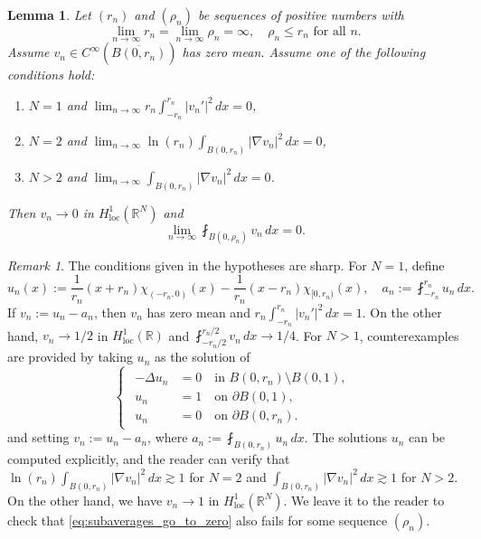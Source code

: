 \documentclass{article}
\numberwithin{equation}{section}
\newtheorem{lemma}[theorem]{Lemma}
\theoremstyle{definition}
\theoremstyle{remark}
\newtheorem{remark}{Remark}[theorem]
\begin{document}
\begin{lemma} \label{lm:vanishing_averages}
    Let $(r_n)$ and $(\rho_n)$ be sequences of positive numbers with
    \[
    \lim_{n \to \infty} r_n = \lim_{n \to \infty} \rho_n = \infty, \quad \rho_n \le r_n \text{ for all } n.
    \]
    Assume $v_n \in C^\infty(\overline{B(0, r_n)})$ has zero mean. Assume one of the following conditions hold:
    \begin{enumerate}
        \item[(1)] $N = 1$ and $\lim_{n \to \infty} r_n \int_{-r_n}^{r_n} |v_n'|^2 \, dx = 0$,
        \item[(2)] $N = 2$ and $\lim_{n \to \infty} \ln(r_n) \int_{B(0, r_n)} |\nabla v_n|^2 \, dx = 0$,
        \item[(3)] $N > 2$ and $\lim_{n \to \infty} \int_{B(0, r_n)} |\nabla v_n|^2 \, dx = 0$.
    \end{enumerate}
    Then $v_n \to 0$ in $H_\mathrm{loc}^1(\mathbb{R}^N)$ and
    \begin{equation} \label{eq:subaverages_go_to_zero}
        \lim_{n \to \infty} \fint_{B(0, \rho_n)} v_n \, dx = 0.
    \end{equation}
\end{lemma}

\begin{remark} \label{rmk:explanation_of_the_factors}
    The conditions given in the hypotheses are sharp. For $N = 1$, define
    \[
    u_n(x) := \frac{1}{r_n}(x + r_n) \chi_{(-r_n, 0)}(x) - \frac{1}{r_n}(x - r_n) \chi_{[0, r_n)}(x), \quad a_n := \fint_{-r_n}^{r_n} u_n \, dx.
    \]
    If $v_n := u_n - a_n$, then $v_n$ has zero mean and $r_n \int_{-r_n}^{r_n} |v_n'|^2 \, dx = 1$. On the other hand, $v_n \to 1/2$ in $H_\mathrm{loc}^1(\mathbb{R})$ and $\fint_{-r_n/2}^{r_n/2} v_n \, dx \to 1/4$. For $N > 1$, counterexamples are provided by taking $u_n$ as the solution of
    \begin{equation*}
        \begin{cases}
            \begin{alignedat}{1}
                - \Delta u_n &= 0 \quad \text{in } B(0, r_n) \setminus B(0, 1), \\
                u_n &= 1 \quad \text{on } \partial B(0, 1), \\
                u_n &= 0 \quad \text{on } \partial B(0, r_n).
            \end{alignedat}
        \end{cases}
    \end{equation*}
    and setting $v_n := u_n - a_n$, where $a_n := \fint_{B(0, r_n)} u_n \, dx$. The solutions $u_n$ can be computed explicitly, and the reader can verify that $\ln(r_n) \int_{B(0, r_n)} |\nabla v_n|^2 \, dx \gtrsim 1$ for $N = 2$ and $\int_{B(0, r_n)} |\nabla v_n|^2 \, dx \gtrsim 1$ for $N > 2$. On the other hand, we have $v_n \to 1$ in $H_\mathrm{loc}^1(\mathbb{R}^N)$. We leave it to the reader to check that \eqref{eq:subaverages_go_to_zero} also fails for some sequence $(\rho_n)$.
\end{remark}
\end{document}
